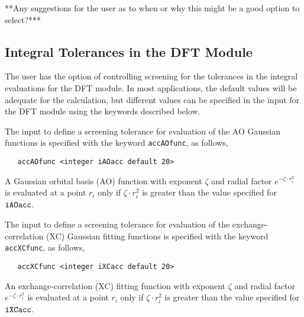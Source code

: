 \Large
**Any suggestions for the user as to when or why this might be a good option
to select?***
\normalsize



\subsection{Integral Tolerances in the DFT Module}


The user has the option of controlling screening for the tolerances in
the integral evaluations for the DFT module.  In most applications, the
default values will be adequate for the calculation, but different values
can be specified in the input for the DFT module using the keywords
described below.

The input to define a screening tolerance for evaluation of the AO 
Gaussian functions is specified with the keyword \verb+accAOfunc+, as
follows,

\begin{verbatim}
   accAOfunc <integer iAOacc default 20>
\end{verbatim}

A Gaussian orbital basis (AO) function with exponent $\zeta$
and radial factor $e^{-\zeta\cdot r_i^2}$ is 
evaluated  at a point $r_i$ only if 
$\zeta\cdot r_i^2$ is greater than the value specified for ${\tt iAOacc}$.

The input to define a screening tolerance for evaluation of the exchange-
correlation (XC) Gaussian fitting functions is specified with the
keyword \verb+accXCfunc+, as follows,
 
\begin{verbatim}
   accXCfunc <integer iXCacc default 20>
\end{verbatim}

An exchange-correlation (XC) fitting function with exponent $\zeta$
and radial factor $e^{-\zeta\cdot r_i^2}$ is 
evaluated  at a point $r_i$ only if 
$\zeta\cdot r_i^2$ is greater than the value specified for ${\tt iXCacc}$.

